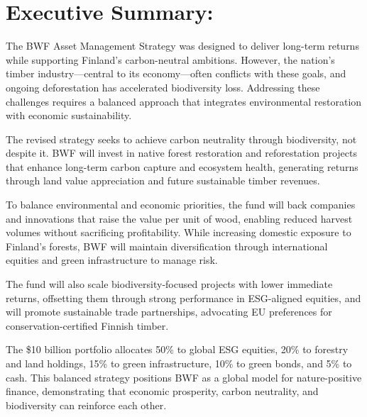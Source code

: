 

\section*{Executive Summary:}

\par The BWF Asset Management Strategy was designed to deliver long-term returns while supporting Finland’s carbon-neutral ambitions. However, the nation’s timber industry—central to its economy—often conflicts with these goals, and ongoing deforestation has accelerated biodiversity loss. Addressing these challenges requires a balanced approach that integrates environmental restoration with economic sustainability.
\par The revised strategy seeks to achieve carbon neutrality through biodiversity, not despite it. BWF will invest in native forest restoration and reforestation projects that enhance long-term carbon capture and ecosystem health, generating returns through land value appreciation and future sustainable timber revenues.
\par To balance environmental and economic priorities, the fund will back companies and innovations that raise the value per unit of wood, enabling reduced harvest volumes without sacrificing profitability. While increasing domestic exposure to Finland’s forests, BWF will maintain diversification through international equities and green infrastructure to manage risk.
\par The fund will also scale biodiversity-focused projects with lower immediate returns, offsetting them through strong performance in ESG-aligned equities, and will promote sustainable trade partnerships, advocating EU preferences for conservation-certified Finnish timber.
\par The \$10 billion portfolio allocates 50\% to global ESG equities, 20\% to forestry and land holdings, 15\% to green infrastructure, 10\% to green bonds, and 5\% to cash.
This balanced strategy positions BWF as a global model for nature-positive finance, demonstrating that economic prosperity, carbon neutrality, and biodiversity can reinforce each other.
